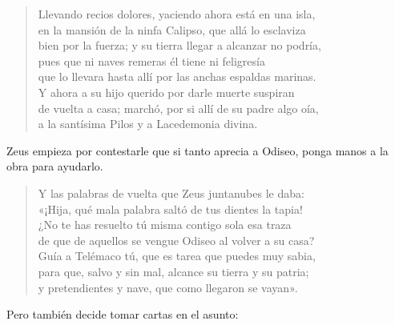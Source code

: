 \documentclass[11pt,a4paper]{article}
\begin{document}
\begin{verse}
Llevando recios dolores, yaciendo ahora está en una isla,\\
en la mansión de la ninfa Calipso, que allá lo esclaviza\\
bien por la fuerza; y su tierra llegar a alcanzar no podría,\\
pues que ni naves remeras él tiene ni feligresía\\
que lo llevara hasta allí por las anchas espaldas marinas.\\
Y ahora a su hijo querido por darle muerte suspiran\\
de vuelta a casa; marchó, por si allí de su padre algo oía,\\
a la santísima Pilos y a Lacedemonia divina.
\end{verse}


Zeus empieza por contestarle que si tanto aprecia a Odiseo, ponga manos a la obra para ayudarlo.

\begin{verse}
Y las palabras de vuelta que Zeus juntanubes le daba:\\
«¡Hija, qué mala palabra saltó de tus dientes la tapia!\\
¿No te has resuelto tú misma contigo sola esa traza\\
de que de aquellos se vengue Odiseo al volver a su casa?\\
Guía a Telémaco tú, que es tarea que puedes muy sabia,\\
para que, salvo y sin mal, alcance su tierra y su patria;\\
y pretendientes y nave, que como llegaron se vayan».
\end{verse}

Pero también decide tomar cartas en el asunto:
\end{document}
